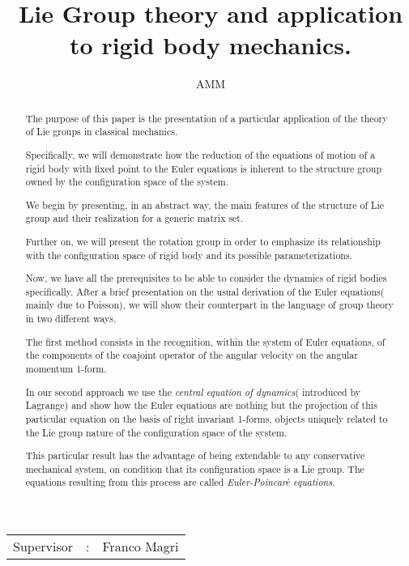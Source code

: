 \documentclass[11pt]{article}
\title{Lie Group theory and application to rigid body mechanics. }
\author{AMM}
\date{}
\begin{document}
\maketitle

\begin{center}
\begin{tabular}{l c l}
Supervisor & : & Franco Magri \\
\end{tabular}

\end{center}



\begin{abstract}
The purpose of this paper is the presentation of a particular application of the theory of Lie groups in classical mechanics.

Specifically, we will demonstrate how the reduction of the equations of motion of a rigid body with fixed point to the Euler equations is inherent to the structure group owned by the configuration space of the system.

We begin by presenting, in an abstract way, the main features of the structure of Lie group and their realization for a generic matrix set.

Further on, we will present the rotation group in order to emphasize its relationship with the configuration space of rigid body and its possible parameterizations.

Now, we have all the prerequisites to be able to consider the dynamics of rigid bodies specifically. After a brief presentation on the usual derivation of the Euler equations( mainly due to Poisson), we will show their counterpart in the language of group theory in two different ways.

The first method consists in the recognition, within the system of Euler equations, of the components of the coajoint operator of the angular velocity on the angular momentum 1-form.

In our second approach we use the \emph{central equation of dynamics}( introduced by Lagrange) and show how the Euler equations are nothing but the projection of this particular equation on the basis of right invariant 1-forms, objects uniquely related to the Lie group nature of the configuration space of the system.

This particular result has the advantage of being extendable to any conservative mechanical system, on condition that its configuration space is a Lie group. The equations resulting from this process are called \emph{Euler-Poincarè equations}.
\end{abstract}
\end{document}
